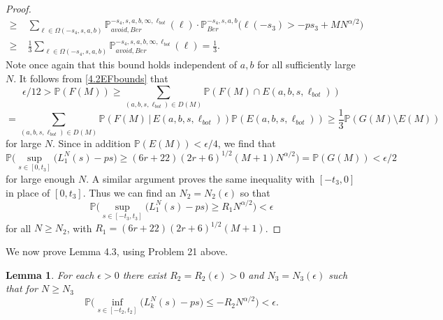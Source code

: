 \documentclass[12pt]{article}
\newtheorem{lemma}{Lemma}
\begin{document}
\begin{proof}
\begin{align*}
		\geq \; & \sum_{\ell\in\Omega(-s_4,s,a,b)} \mathbb{P}^{-s_4,s,a,b,\infty,\ell_{bot}}_{avoid, Ber}(\ell)\cdot \mathbb{P}^{-s_4,s,a,b}_{Ber}\big(\ell(-s_3) > -ps_3 + MN^{\alpha/2}\big)\\
		\geq \; & \frac{1}{3}\sum_{\ell\in\Omega(-s_4,s,a,b)} \mathbb{P}^{-s_4,s,a,b,\infty,\ell_{bot}}_{avoid, Ber}(\ell) = \frac{1}{3}.
		\end{align*}
		Note once again that this bound holds independent of $a,b$ for all sufficiently large $N$. It follows from \eqref{4.2EFbounds} that
		\[
		\epsilon/12 > \mathbb{P}(F(M)) \geq \sum_{(a,b,s,\ell_{bot})\in D(M)} \mathbb{P}(F(M)\cap E(a,b,s,\ell_{bot}))
		\]
		\[
		= \sum_{(a,b,s,\ell_{bot})\in D(M)} \mathbb{P}(F(M)\,|\, E(a,b,s,\ell_{bot}))\mathbb{P}(E(a,b,s,\ell_{bot})) \geq \frac{1}{3}\mathbb{P}(G(M)\setminus E(M))
		\]
		for large $N$. Since in addition $\mathbb{P}(E(M)) < \epsilon/4$, we find that
		\[
		\mathbb{P}\Big( \sup_{s \in [0,t_3] }\big( L^N_1(s) - p s \big) \geq  (6r+22)(2r+6)^{1/2}(M+1)N^{\alpha/2} \Big) = \mathbb{P}(G(M)) < \epsilon/2
		\]
		for large enough $N$. A similar argument proves the same inequality with $[-t_3,0]$ in place of $[0,t_3]$. Thus we can find an $N_2 = N_2(\epsilon)$ so that
		\[
		\mathbb{P}\Big( \sup_{s \in [-t_3,t_3] }\big( L^N_1(s) - p s \big) \geq  R_1N^{\alpha/2} \Big) < \epsilon
		\]
		for all $N\geq N_2$, with $R_1 = (6r+22)(2r+6)^{1/2}(M+1)$.
		
	\end{proof}

	We now prove Lemma 4.3, using Problem 21 above.

	\begin{lemma}\label{PropSup2} For each $\epsilon > 0$ there exist $R_2=R_2( \epsilon) > 0$ and $N_3=N_3(\epsilon)$ such that for $N \geq N_3$
	$$\mathbb{P}\Big( \inf_{s \in [ -t_2, t_2 ]}\big(L^N_k(s) - p s \big) \leq - R_2N^{\alpha/2} \Big) < \epsilon.$$
	\end{lemma}
\end{document}
